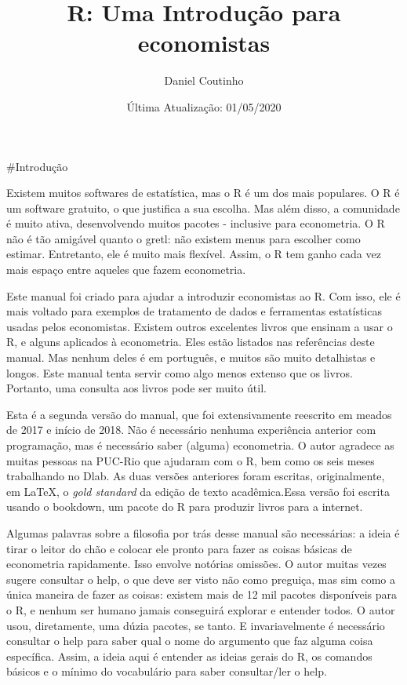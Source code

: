 \documentclass[
]{book}
\title{R: Uma Introdução para economistas}
\author{Daniel Coutinho}
\date{Última Atualização: 01/05/2020}
\begin{document}
\maketitle

{
\setcounter{tocdepth}{1}
\tableofcontents
}
\#Introdução

Existem muitos softwares de estatística, mas o R é um dos mais populares. O R é um software gratuito, o que justifica a sua escolha. Mas além disso, a comunidade é muito ativa, desenvolvendo muitos pacotes - inclusive para econometria. O R não é tão amigável quanto o gretl: não existem menus para escolher como estimar. Entretanto, ele é muito mais flexível. Assim, o R tem ganho cada vez mais espaço entre aqueles que fazem econometria.

Este manual foi criado para ajudar a introduzir economistas ao R. Com isso, ele é mais voltado para exemplos de tratamento de dados e ferramentas estatísticas usadas pelos economistas. Existem outros excelentes livros que ensinam a usar o R, e alguns aplicados à econometria. Eles estão listados nas referências deste manual. Mas nenhum deles é em português, e muitos são muito detalhistas e longos. Este manual tenta servir como algo menos extenso que os livros. Portanto, uma consulta aos livros pode ser muito útil.

Esta é a segunda versão do manual, que foi extensivamente reescrito em meados de 2017 e início de 2018. Não é necessário nenhuma experiência anterior com programação, mas é necessário saber (alguma) econometria. O autor agradece as muitas pessoas na PUC-Rio que ajudaram com o R, bem como os seis meses trabalhando no Dlab. As duas versões anteriores foram escritas, originalmente, em LaTeX, o \emph{gold standard} da edição de texto acadêmica.Essa versão foi escrita usando o bookdown, um pacote do R para produzir livros para a internet.

Algumas palavras sobre a filosofia por trás desse manual são necessárias: a ideia é tirar o leitor do chão e colocar ele pronto para fazer as coisas básicas de econometria rapidamente. Isso envolve notórias omissões. O autor muitas vezes sugere consultar o help, o que deve ser visto não como preguiça, mas sim como a única maneira de fazer as coisas: existem mais de 12 mil pacotes disponíveis para o R, e nenhum ser humano jamais conseguirá explorar e entender todos. O autor usou, diretamente, uma dúzia pacotes, se tanto. E invariavelmente é necessário consultar o help para saber qual o nome do argumento que faz alguma coisa específica. Assim, a ideia aqui é entender as ideias gerais do R, os comandos básicos e o mínimo do vocabulário para saber consultar/ler o help.
\end{document}
